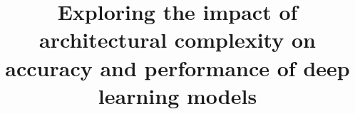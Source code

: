 \documentclass[conference]{IEEEtran}
\begin{document}
\newpage

\title{Exploring the impact of architectural complexity on accuracy and performance of deep learning models}


%



\maketitle
\thispagestyle{plain}
\pagestyle{plain}

 

{
  \renewcommand{\thefootnote}{}
  \renewcommand{\thefootnote}{\arabic{footnote}}
}











% 
% 




\newpage


% 
% 
% 
\end{document}
